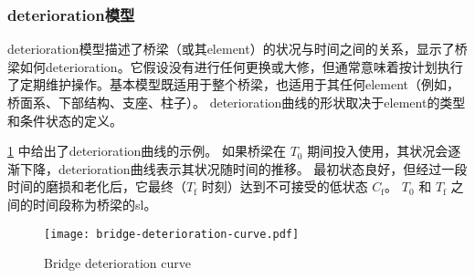 \subsubsection{\gls*{deterioration}模型}
\gls*{deterioration}模型描述了桥梁（或其\gls*{element}）的状况与时间之间的关系，显示了桥梁如何\gls*{deterioration}。它假设没有进行任何更换或大修，但通常意味着按计划执行了定期维护操作。基本模型既适用于整个桥梁，也适用于其任何\gls*{element}（例如，桥面系、下部结构、支座、柱子）。 \gls*{deterioration}曲线的形状取决于\gls*{element}的类型和条件状态的定义。

\cref{fig:brg-deterioration-curve} 中给出了\gls*{deterioration}曲线的示例。 如果桥梁在 $T_0$ 期间投入使用，其状况会逐渐下降，\gls*{deterioration}曲线表示其状况随时间的推移。 最初状态良好，但经过一段时间的磨损和老化后，它最终（$T_\text{f}$ 时刻）达到不可接受的低状态 $C_\text{f}$。 $T_0$ 和 $T_\text{f}$ 之间的时间段称为桥梁的\acrfull*{sl}。

\begin{figure}
  \texttt{[image: bridge-deterioration-curve.pdf]}
  \caption{Bridge deterioration curve}\label{fig:brg-deterioration-curve}
\end{figure}


